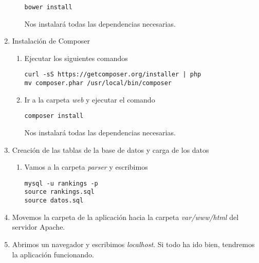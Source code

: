 \begin{enumerate}
\begin{enumerate}
\begin{verbatim}
bower install
\end{verbatim} 

Nos instalará todas las dependencias necesarias.
\end{enumerate}

\item Instalación de Composer

\begin{enumerate}
\item Ejecutar los siguientes comandos

\begin{verbatim}
curl -sS https://getcomposer.org/installer | php
mv composer.phar /usr/local/bin/composer
\end{verbatim} 

\item Ir a la carpeta \emph{web} y ejecutar el comando 

\begin{verbatim}
composer install
\end{verbatim}

Nos instalará todas las dependencias necesarias.

\end{enumerate}

\item Creación de las tablas de la base de datos y carga de los datos

\begin{enumerate}
\item Vamos a la carpeta \emph{parser} y escribimos

\begin{verbatim}
mysql -u rankings -p
source rankings.sql
source datos.sql
\end{verbatim}

\end{enumerate}

\item Movemos la carpeta de la aplicación hacia la carpeta \emph{var/www/html} del servidor Apache.

\item Abrimos un navegador y escribimos \emph{localhost}. Si todo ha ido bien, tendremos la aplicación funcionando.

\end{enumerate}